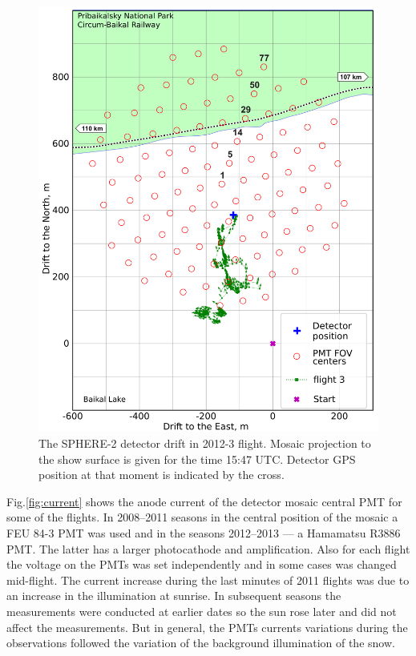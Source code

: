 \documentclass[universe,article,submit,moreauthors,pdftex]{Definitions/mdpi}
\begin{document}
\begin{figure}[tb]
\begin{minipage}[t]{0.48\textwidth}
        \includegraphics[width=\textwidth]{2012_drift-mod.pdf}
        \caption{The SPHERE-2 detector drift in 2012-3 flight. Mosaic projection to the show surface is given for the time 15:47 UTC. Detector GPS position at that moment is indicated by the cross.}
        \label{fig:2012-drift}
    \end{minipage}
\end{figure}

 Fig.\ref{fig:current} shows the anode current of the detector mosaic central PMT for some of the flights. In 2008--2011 seasons in the central position of the mosaic a FEU 84-3 PMT was used and in the seasons 2012--2013 --- a Hamamatsu R3886 PMT. The latter has a larger photocathode and amplification. Also for each flight the voltage on the PMTs was set independently and in some cases was changed mid-flight. The current increase during the last minutes of 2011 flights was due to an increase in the illumination at sunrise. In subsequent seasons the measurements were conducted at earlier dates so the sun rose later and did not affect the measurements. But in general, the PMTs currents variations during the observations followed the variation of the background illumination of the snow.
\end{document}
